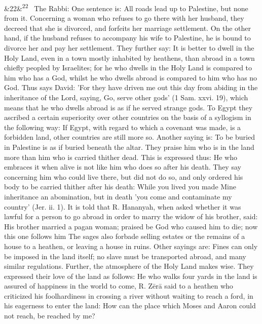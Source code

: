 \documentclass[12pt]{article}
\newcommand{\para}[1][]{\par\noindent\ifx&#1&\else\textsuperscript{\footnotesize #1}~\fi}
\begin{document}
\para[22] The Rabbi: One sentence is: All roads lead up to Palestine, but none from it. Concerning a woman who refuses to go there with her husband, they decreed that she is divorced, and forfeits her marriage settlement. On the other hand, if the husband refuses to accompany his wife to Palestine, he is bound to divorce her and pay her settlement. They further say: It is better to dwell in the Holy Land, even in a town mostly inhabited by heathens, than abroad in a town chiefly peopled by Israelites; for he who dwells in the Holy Land is compared to him who has a God, whilst he who dwells abroad is compared to him who has no God. Thus says David: 'For they have driven me out this day from abiding in the inheritance of the Lord, saying, Go, serve other gods' (1 Sam. xxvi. 19), which means that he who dwells abroad is as if he served strange gods. To Egypt they ascribed a certain superiority over other countries on the basis of a syllogism in the following way: If Egypt, with regard to which a covenant was made, is a forbidden land, other countries are still more so. Another saying is: To be buried in Palestine is as if buried beneath the altar. They praise him who is in the land more than him who is carried thither dead. This is expressed thus: He who embraces it when alive is not like him who does so after his death. They say concerning him who could live there, but did not do so, and only ordered his body to be carried thither after his death: While you lived you made Mine inheritance an abomination, but in death 'you come and contaminate my country' (Jer. ii. 1). It is told that R. Hananyah, when asked whether it was lawful for a person to go abroad in order to marry the widow of his brother, said: His brother married a pagan woman; praised be God who caused him to die; now this one follows him The sages also forbade selling estates or the remains of a house to a heathen, or leaving a house in ruins. Other sayings are: Fines can only be imposed in the land itself; no slave must be transported abroad, and many similar regulations. Further, the atmosphere of the Holy Land makes wise. They expressed their love of the land as follows: He who walks four yards in the land is assured of happiness in the world to come, R. Zērā said to a heathen who criticized his foolhardiness in crossing a river without waiting to reach a ford, in his eagerness to enter the land: How can the place which Moses and Aaron could not reach, be reached by me?
\end{document}
